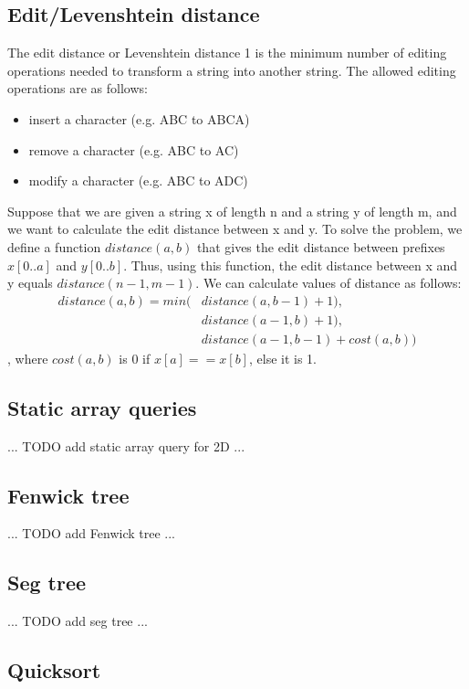 \documentclass[a4paper]{article}
\begin{document}
\subsection{Edit/Levenshtein distance}
The edit distance or Levenshtein distance 1 is the minimum number of editing operations needed to transform a string into another string. The allowed editing operations are as follows:
\begin{itemize}
  \item insert a character (e.g. ABC to ABCA)
  \item remove a character (e.g. ABC to AC)
  \item modify a character (e.g. ABC to ADC)
\end{itemize}
Suppose that we are given a string x of length n and a string y of length m, and we want to calculate the edit distance between x and y. To solve the problem, we define a function $distance(a, b)$ that gives the edit distance between prefixes
$x[0..a]$ and $y[0..b]$. Thus, using this function, the edit distance between x and y equals $distance(n - 1, m - 1)$.
We can calculate values of distance as follows:
\begin{align}
  distance(a, b) = min(&distance(a, b - 1) + 1), \\
                       &distance(a - 1, b) + 1), \\
                       &distance(a - 1, b - 1) + cost(a, b))
\end{align}
, where $cost(a, b)$ is 0 if $x[a] == x[b]$, else it is 1.


\subsection{Static array queries}
... TODO add static array query for 2D ...


\subsection{Fenwick tree}
... TODO add Fenwick tree ...


\subsection{Seg tree}
... TODO add seg tree ...


\subsection{Quicksort}

\end{document}
